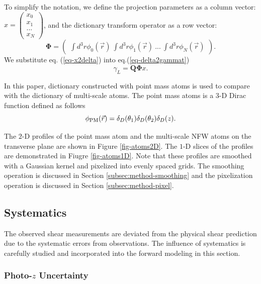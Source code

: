 \documentclass[twocolumn]{aastex62}
\begin{document}
To simplify the notation, we define the projection parameters as a column vector:
$x=\begin{pmatrix}
x_{0}\\
x_{1}\\
...\\
x_{N}
\end{pmatrix}$,
and the dictionary transform operator as a row vector:
\begin{equation}
\mathbf{\Phi}=\begin{pmatrix}
\int d^3r\phi_0(\vec{r}) ~\int d^3r \phi_1(\vec{r})~ ...~\int d^3r \phi_{N}(\vec{r})
\end{pmatrix}.
\end{equation}
We substitute eq. (\ref{eq-x2delta}) into eq.(\ref{eq-delta2gammat})
\begin{equation}\label{eq-x2gammat}
\gamma_L=\mathbf{Q}\mathbf{\Phi} x.
\end{equation}

In this paper, dictionary constructed with point mass atoms is used to compare with the dictionary of multi-scale atoms.
The point mass atoms is a $3$-D Dirac function defined as follows
\begin{equation}
\phi_{\rm{PM}}(\vec{r})= \delta_D(\theta_1) \delta_D(\theta_2) \delta_D(z).
\end{equation}

The $2$-D profiles of the point mass atom and the multi-scale NFW atoms on the transverse plane are shown in Figure
\ref{fig-atoms2D}. The $1$-D slices of the profiles are demonstrated in Fiugre \ref{fig-atoms1D}. Note that these profiles
are smoothed with a Gaussian kernel and pixelized into evenly spaced grids. The smoothing operation is discussed in
Section \ref{subsec:method-smoothing} and the pixelization operation is discussed in Section \ref{subsec:method-pixel}.

\subsection{Systematics}
\label{subsec:method-Systematics}

The observed shear measurements are deviated from the physical shear prediction due to the systematic
errors from observations. The influence of systematics is carefully studied and incorporated into the forward
modeling in this section.

\subsubsection{Photo-$z$ Uncertainty}
\label{subsec:method-photoz}
\end{document}
